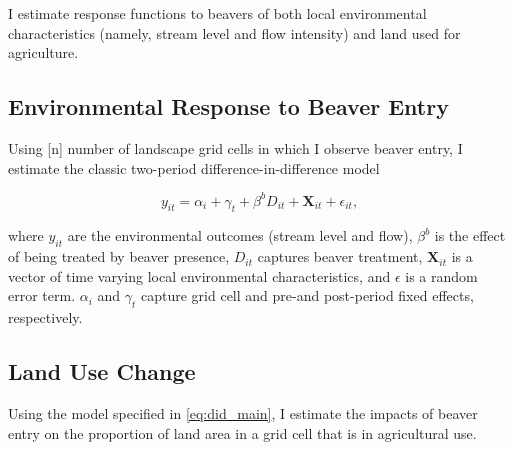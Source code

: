 I estimate response functions to beavers of both local environmental characteristics (namely, stream level and flow intensity) and land used for agriculture.

\subsection{Environmental Response to Beaver Entry}

Using [n] number of landscape grid cells in which I observe beaver entry, I estimate the classic two-period difference-in-difference model

\begin{equation} \label{eq:did_main}
y_{it} = \alpha_i + \gamma_t + \beta^{b}D_{it} + \mathbf{X}_{it} + \epsilon_{it},
\end{equation}

where $y_{it}$ are the environmental outcomes (stream level and flow), $\beta^b$ is the effect of being treated by beaver presence, $D_{it}$ captures beaver treatment, $\mathbf{X}_{it}$ is a vector of time varying local environmental characteristics, and $\epsilon$ is a random error term. $\alpha_i$ and $\gamma_t$ capture grid cell and pre-and post-period fixed effects, respectively.



\subsection{Land Use Change}

Using the model specified in \eqref{eq:did_main}, I estimate the impacts of beaver entry on the proportion of land area in a grid cell that is in agricultural use. 